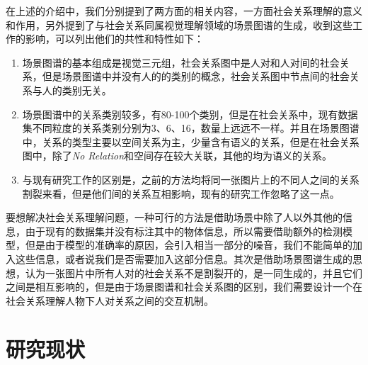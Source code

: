 在上述的介绍中，我们分别提到了两方面的相关内容，一方面社会关系理解的意义和作用，另外提到了与社会关系同属视觉理解领域的场景图谱的生成，收到这些工作的影响，可以列出他们的共性和特性如下：
\begin{enumerate}
    \item 场景图谱的基本组成是视觉三元组，社会关系图中是人对和人对间的社会关系，但是场景图谱中并没有人的的类别的概念，社会关系图中节点间的社会关系与人的类别无关。
    \item 场景图谱中的关系类别较多，有80-100个类别，但是在社会关系中，现有数据集不同粒度的关系类别分别为3、6、16，数量上远远不一样。并且在场景图谱中，关系的类型主要以空间关系为主，少量含有语义的关系，但是在社会关系图中，除了{\it No Relation}和空间存在较大关联，其他的均为语义的关系。
    \item 与现有研究工作的区别是，之前的方法均将同一张图片上的不同人之间的关系割裂来看，但是他们间的关系互相影响，现有的研究工作忽略了这一点。
\end{enumerate}

要想解决社会关系理解问题，一种可行的方法是借助场景中除了人以外其他的信息，由于现有的数据集并没有标注其中的物体信息，所以需要借助额外的检测模型，但是由于模型的准确率的原因，会引入相当一部分的噪音，我们不能简单的加入这些信息，或者说我们是否需要加入这部分信息。其次是借助场景图谱生成的思想，认为一张图片中所有人对的社会关系不是割裂开的，是一同生成的，并且它们之间是相互影响的，但是由于场景图谱和社会关系图的区别，我们需要设计一个在社会关系理解人物下人对关系之间的交互机制。

\section{研究现状}

